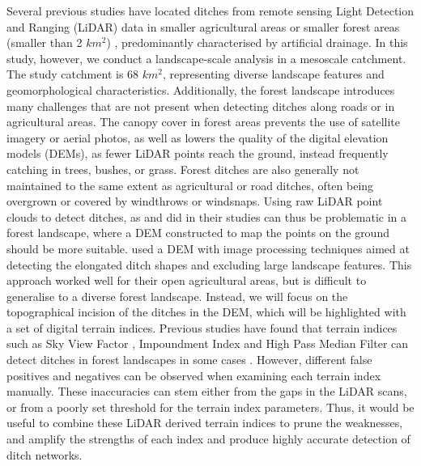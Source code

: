 \documentclass[11pt, review]{elsarticle} %
\begin{document}
Several previous studies have located ditches from remote sensing Light Detection and Ranging (LiDAR) data in smaller agricultural areas \citep{roelens, bailly} or smaller forest areas (smaller than 2 $km^2$) \citep{rapinel, kiss}, predominantly characterised by artificial drainage. In this study, however, we conduct a landscape-scale analysis in a mesoscale catchment. The study  catchment  is 68 $km^2$, representing diverse landscape features and geomorphological characteristics. Additionally, the forest landscape introduces many challenges that are not present when detecting ditches along roads or in agricultural areas. The canopy cover in forest areas prevents the use of satellite imagery or aerial photos, as well as lowers the quality of the digital elevation models (DEMs), as fewer LiDAR points reach the ground, instead frequently catching in trees, bushes, or grass. Forest ditches are also generally not maintained to the same extent as agricultural or road ditches, often being overgrown or covered by windthrows or windsnaps. Using raw LiDAR point clouds to detect ditches, as \citet{roelens} and \citet{bailly} did in their studies can thus be problematic in a forest landscape, where a DEM constructed to map the points on the ground should be more suitable. \citet{cazorzi} used a DEM with image processing techniques aimed at detecting the elongated ditch shapes and excluding large landscape features. This approach worked well for their open agricultural areas, but is difficult to generalise to a diverse forest landscape. Instead, we will focus on the topographical incision of the ditches in the DEM, which will be highlighted with a set of digital terrain indices. Previous studies have found that terrain indices such as Sky View Factor \citep{zaksek}, Impoundment Index \citep{whiteboxtools} and High Pass Median Filter \citep{whiteboxtools} can detect ditches in forest landscapes in some cases \citep{uppsala}. However, different false positives and negatives can be observed when examining each terrain index manually. These inaccuracies can stem either from the gaps in the LiDAR scans, or from a poorly set threshold for the terrain index parameters. Thus, it would be useful to combine these LiDAR derived terrain indices to prune the weaknesses, and amplify the strengths of each index and produce highly accurate detection of ditch networks. 
\end{document}
